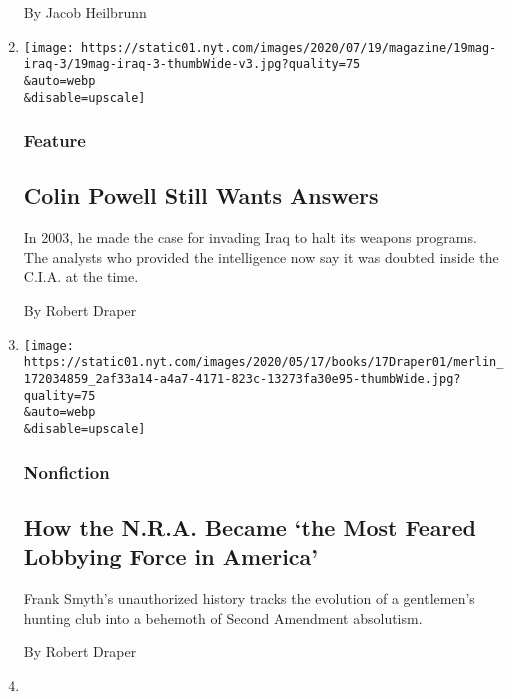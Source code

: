 \begin{enumerate}
  By Jacob Heilbrunn
\item
  \href{/2020/07/16/magazine/colin-powell-iraq-war.html}{}

  \texttt{[image: https://static01.nyt.com/images/2020/07/19/magazine/19mag-iraq-3/19mag-iraq-3-thumbWide-v3.jpg?quality=75\\\&auto=webp\\\&disable=upscale]}

  \hypertarget{feature-1}{%
  \subsubsection{Feature}\label{feature-1}}

  \hypertarget{colin-powell-still-wants-answers}{%
  \subsection{Colin Powell Still Wants
  Answers}\label{colin-powell-still-wants-answers}}

  In 2003, he made the case for invading Iraq to halt its weapons
  programs. The analysts who provided the intelligence now say it was
  doubted inside the C.I.A. at the time.

  By Robert Draper
\item
  \href{/2020/05/01/books/review/the-nra-frank-smyth.html}{}

  \texttt{[image: https://static01.nyt.com/images/2020/05/17/books/17Draper01/merlin\_172034859\_2af33a14-a4a7-4171-823c-13273fa30e95-thumbWide.jpg?quality=75\\\&auto=webp\\\&disable=upscale]}

  \hypertarget{nonfiction-1}{%
  \subsubsection{Nonfiction}\label{nonfiction-1}}

  \hypertarget{how-the-nra-became-the-most-feared-lobbying-force-in-america}{%
  \subsection{How the N.R.A. Became `the Most Feared Lobbying Force in
  America'}\label{how-the-nra-became-the-most-feared-lobbying-force-in-america}}

  Frank Smyth's unauthorized history tracks the evolution of a
  gentlemen's hunting club into a behemoth of Second Amendment
  absolutism.

  By Robert Draper
\item
  \href{/2020/04/28/magazine/trump-campaign-manager-coronavirus.html}{}


\end{enumerate}
